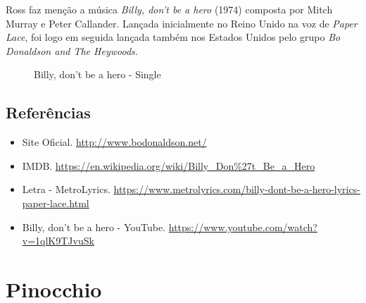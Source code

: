 \saveparinfos
\noindent
\begin{minipage}[c]{0.5\textwidth}\useparinfo

Ross faz menção a música \emph{Billy, don't be a hero} (1974) composta
por Mitch Murray e Peter Callander. Lançada inicialmente no Reino Unido
na voz de \emph{Paper Lace}, foi logo em seguida lançada também nos
Estados Unidos pelo grupo \emph{Bo Donaldson and The Heywoods.}

\end{minipage}\hfill
\begin{minipage}[c]{0.5\textwidth}

\begin{figure}
  \centering
    \caption{Billy, don’t be a hero - Single\label{fig:billy-don-t-be-a-hero-single}}
\end{figure}

\end{minipage}

\hypertarget{referuxeancias-6}{%
\subsection{Referências}\label{referuxeancias-6}}

\begin{itemize}
\tightlist
\item
  \sloppy Site Oficial. \url{http://www.bodonaldson.net/}
\item
  \sloppy IMDB. \url{https://en.wikipedia.org/wiki/Billy_Don%27t_Be_a_Hero}
\item
  \sloppy Letra - MetroLyrics. \url{https://www.metrolyrics.com/billy-dont-be-a-hero-lyrics-paper-lace.html}
\item
  \sloppy Billy, don’t be a hero - YouTube. \url{https://www.youtube.com/watch?v=1qlK9TJvuSk}
\end{itemize}

\hypertarget{pinocchio}{%
\section{Pinocchio}\label{pinocchio}}

